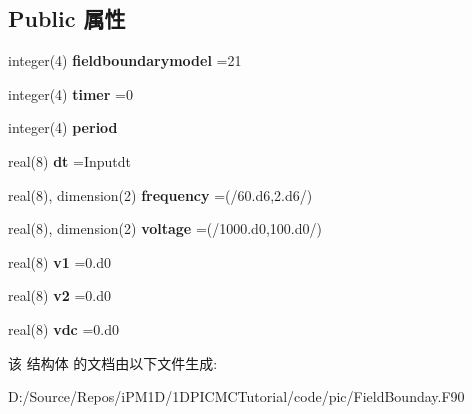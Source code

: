 \subsection*{Public 属性}
\begin{DoxyCompactItemize}
\item 
\mbox{\label{structmodulefieldboundary_1_1fieldboundary_ab8de8d88fed192b09a9801221b968af3}} 
integer(4) {\bfseries fieldboundarymodel} =21
\item 
\mbox{\label{structmodulefieldboundary_1_1fieldboundary_a94e1bd51a3385ede16f0202674320df0}} 
integer(4) {\bfseries timer} =0
\item 
\mbox{\label{structmodulefieldboundary_1_1fieldboundary_ac78a8397ea63dc5e32b42a7c75b87fc5}} 
integer(4) {\bfseries period}
\item 
\mbox{\label{structmodulefieldboundary_1_1fieldboundary_a5dcdf9bec5814f787a849c2b378f0d08}} 
real(8) {\bfseries dt} =Inputdt
\item 
\mbox{\label{structmodulefieldboundary_1_1fieldboundary_a6bc47b9a3cadc4161fc653474786f614}} 
real(8), dimension(2) {\bfseries frequency} =(/60.d6,2.d6/)
\item 
\mbox{\label{structmodulefieldboundary_1_1fieldboundary_a06addd6e7e04838ea9b2ebf53167d122}} 
real(8), dimension(2) {\bfseries voltage} =(/1000.d0,100.d0/)
\item 
\mbox{\label{structmodulefieldboundary_1_1fieldboundary_ac2a7ae8e5693191368bed4a03b3f44ec}} 
real(8) {\bfseries v1} =0.d0
\item 
\mbox{\label{structmodulefieldboundary_1_1fieldboundary_a53c6b2302b4243cd47d0bb28a65876d1}} 
real(8) {\bfseries v2} =0.d0
\item 
\mbox{\label{structmodulefieldboundary_1_1fieldboundary_a1dda03cabbc4cc6adf5eb8a06410034e}} 
real(8) {\bfseries vdc} =0.d0
\end{DoxyCompactItemize}


该 结构体 的文档由以下文件生成\+:\begin{DoxyCompactItemize}
\item 
D\+:/\+Source/\+Repos/i\+P\+M1\+D/1\+D\+P\+I\+C\+M\+C\+Tutorial/code/pic/Field\+Bounday.\+F90\end{DoxyCompactItemize}
